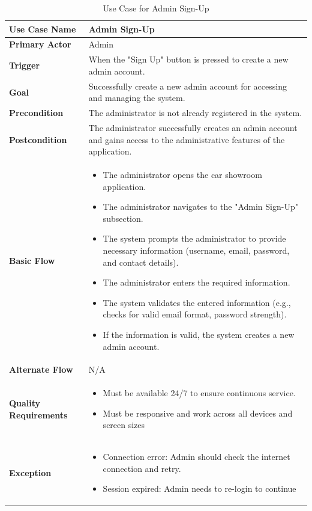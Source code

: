 \documentclass[12pt]{report}
\begin{document}
\begin{table}[h!]

\begin{tabular}{|p{3.5cm}|p{10cm}|}
\hline
\textbf{Use Case Name} & Admin Sign-Up \\ 
\hline
\textbf{Primary Actor} & Admin \\ 
\hline
\textbf{Trigger} & When the "Sign Up" button is pressed to create a new admin account. \\ 
\hline
\textbf{Goal} & Successfully create a new admin account for accessing and managing the system. \\ 
\hline
\textbf{Precondition} & The administrator is not already registered in the system. \\ 
\hline
\textbf{Postcondition} & The administrator successfully creates an admin account and gains access to the administrative features of the application. \\ 

\hline
\textbf{Basic Flow} & 
\begin{itemize}
    \item The administrator opens the car showroom application.
    \item The administrator navigates to the "Admin Sign-Up" subsection.
    \item The system prompts the administrator to provide necessary information (username, email, password, and contact details).
    \item The administrator enters the required information.
    \item The system validates the entered information (e.g., checks for valid email format, password strength).
    \item If the information is valid, the system creates a new admin account.
\end{itemize} \\ 
\hline
\textbf{Alternate Flow} & N/A \\ 
\hline

\textbf{Quality Requirements} & 
\begin{itemize}
    \item Must be available 24/7 to ensure continuous service.
    \item Must be responsive and work across all devices and screen sizes
\end{itemize} \\ 
\hline
\textbf{Exception} & 
\begin{itemize}
    \item Connection error: Admin should check the internet connection and retry.
    \item Session expired: Admin needs to re-login to continue
\end{itemize} \\ 
\hline
\end{tabular}

\caption{Use Case for Admin Sign-Up} %
\end{table}
\end{document}
